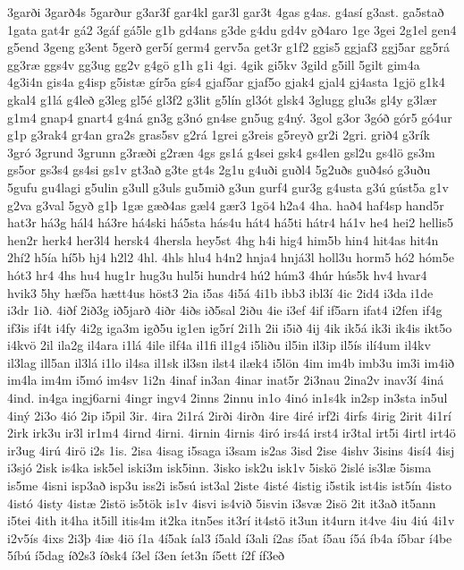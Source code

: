 {3garði
3garð4s
5garður
g3ar3f
gar4kl
gar3l
gar3t
4gas
g4as.
g4así
g3ast.
ga5stað
1gata
gat4r
gá2
3gáf
gá5le
g1b
gd4ans
g3de
g4du
gd4v
gð4aro
1ge
3gei
2g1el
gen4
g5end
3geng
g3ent
5gerð
ger5í
germ4
gerv5a
get3r
g1f2
ggis5
ggjaf3
ggj5ar
gg5rá
gg3ræ
ggs4v
gg3ug
gg2v
g4gö
g1h
g1i
4gi.
4gik
gi5kv
3gild
g5ill
5gilt
gim4a
4g3i4n
gis4a
g4isp
g5istæ
gír5a
gís4
gjaf5ar
gjaf5o
gjak4
gjal4
gj4asta
1gjö
g1k4
gkal4
g1lá
g4leð
g3leg
gl5é
gl3f2
g3lit
g5lín
gl3ót
glsk4
3glugg
glu3s
gl4y
g3lær
g1m4
gnap4
gnart4
g4ná
gn3g
g3nó
gn4se
gn5ug
g4ný.
3gol
g3or
3góð
gór5
gó4ur
g1p
g3rak4
gr4an
gra2s
gras5sv
g2rá
1grei
g3reis
g5reyð
gr2i
2gri.
grið4
g3rík
3gró
3grund
3grunn
g3ræði
g2ræn
4gs
gs1á
g4sei
gsk4
gs4len
gsl2u
gs4lö
gs3m
gs5or
gs3s4
gs4si
gs1v
gt3að
g3te
gt4s
2g1u
g4uði
guðl4
5g2uðs
guð4só
g3uðu
5gufu
gu4lagi
g5ulin
g3ull
g3uls
gu5mið
g3un
gurf4
gur3g
g4usta
g3ú
gúst5a
g1v
g2va
g3val
5gyð
g1þ
1gæ
gæð4as
gæl4
gær3
1gö4
h2a4
4ha.
hað4
haf4sp
hand5r
hat3r
há3g
hál4
há3re
há4ski
há5sta
hás4u
hát4
há5ti
hátr4
há1v
he4
hei2
hellis5
hen2r
herk4
her3l4
hersk4
4hersla
hey5st
4hg
h4i
hig4
him5b
hin4
hit4as
hit4n
2hí2
h5ía
hí5b
hj4
h2l2
4hl.
4hls
hlu4
h4n2
hnja4
hnjá3l
holl3u
horm5
hó2
hóm5e
hót3
hr4
4hs
hu4
hug1r
hug3u
hul5i
hundr4
hú2
húm3
4húr
hús5k
hv4
hvar4
hvik3
5hy
hæf5a
hætt4us
höst3
2ia
i5as
4i5á
4i1b
ibb3
ibl3í
4ic
2id4
i3da
i1de
i3dr
1ið.
4iðf
2ið3g
ið5jarð
4iðr
4iðs
ið5sal
2iðu
4ie
i3ef
4if
if5arn
ifat4
i2fen
if4g
if3is
if4t
i4fy
4i2g
iga3m
igð5u
ig1en
ig5rí
2i1h
2ii
i5ið
4ij
4ik
ik5á
ik3i
ik4is
ikt5o
i4kvö
2il
ila2g
il4ara
i1lá
4ile
ilf4a
il1fi
il1g4
i5liðu
il5in
il3ip
il5ís
ilí4um
il4kv
il3lag
ill5an
il3lá
i1lo
il4sa
il1sk
il3sn
ilst4
ilæk4
i5lön
4im
im4b
imb3u
im3i
im4ið
im4la
im4m
i5mó
im4sv
1i2n
4inaf
in3an
4inar
inat5r
2i3nau
2ina2v
inav3í
4iná
4ind.
in4ga
ingj6arni
4ingr
ingv4
2inns
2innu
in1o
4inó
in1s4k
in2sp
in3sta
in5ul
4iný
2i3o
4ió
2ip
i5pil
3ir.
4ira
2i1rá
2irði
4irðn
4ire
4iré
irf2i
4irfs
4irig
2irit
4i1rí
2irk
irk3u
ir3l
ir1m4
4irnd
4irni.
4irnin
4irnis
4iró
irs4á
irst4
ir3tal
irt5i
4irtl
irt4ö
ir3ug
4irú
4irö
i2s
1is.
2isa
4isag
i5saga
i3sam
is2as
3isd
2ise
4ishv
3isins
4isí4
4isj
i3sjó
2isk
is4ka
isk5el
iski3m
isk5inn.
3isko
isk2u
isk1v
5iskö
2islé
is3læ
5isma
is5me
4isni
isp3að
isp3u
iss2i
is5sú
ist3al
2iste
4isté
4istig
i5stik
ist4is
ist5ín
4isto
4istó
4isty
4istæ
2istö
is5tök
is1v
4isvi
is4við
5isvin
i3svæ
2isö
2it
it3að
it5ann
i5tei
4ith
it4ha
it5ill
itis4m
it2ka
itn5es
it3rí
it4stö
it3un
it4urn
it4ve
4iu
4iú
4i1v
i2v5ís
4ixs
2i3þ
4iæ
4iö
í1a
4í5ak
íal3
í5ald
í3ali
í2as
í5at
í5au
í5á
íb4a
í5bar
í4be
5íbú
í5dag
íð2s3
íðsk4
í3el
í3en
íet3n
í5ett
í2f
íf3eð
}
